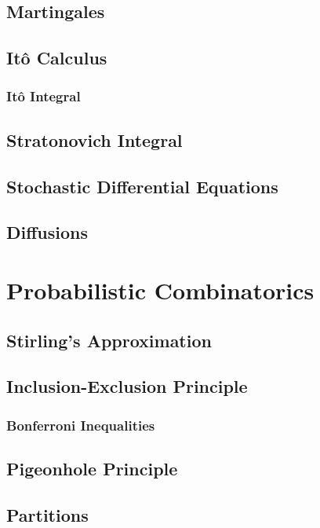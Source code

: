 \documentclass[11pt]{report} %
\begin{document}
\section{Martingales}

\section{It\^{o} Calculus}

\subsection{It\^{o} Integral}

\section{Stratonovich Integral}

\section{Stochastic Differential Equations}

\section{Diffusions}

\chapter{Probabilistic Combinatorics}

\section{Stirling's Approximation}

\section{Inclusion-Exclusion Principle}

\subsection{Bonferroni Inequalities \cite{Lange2010}}

\section{Pigeonhole Principle}

\section{Partitions}
\end{document}
